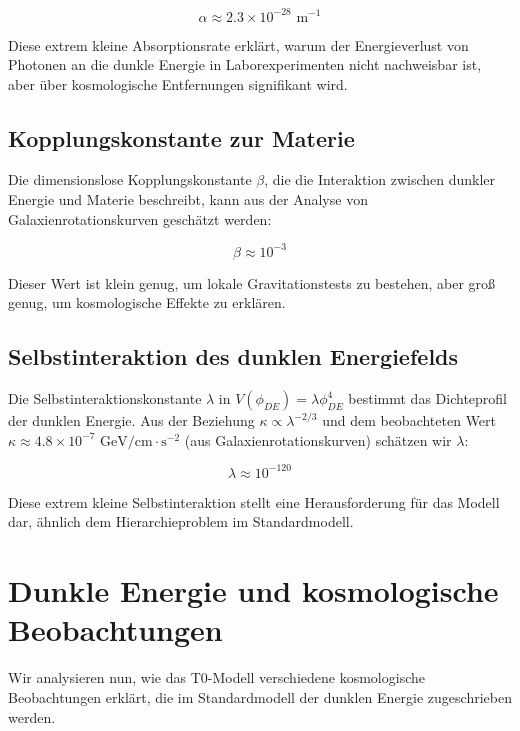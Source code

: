 \documentclass[a4paper,12pt]{article}
\theoremstyle{definition}
\theoremstyle{remark}
\begin{document}
	\begin{equation}
		\alpha \approx 2.3 \times 10^{-28} \text{ m}^{-1}
	\end{equation}
	
	Diese extrem kleine Absorptionsrate erklärt, warum der Energieverlust von Photonen an die dunkle Energie in Laborexperimenten nicht nachweisbar ist, aber über kosmologische Entfernungen signifikant wird.
	
	\subsection{Kopplungskonstante zur Materie}
	Die dimensionslose Kopplungskonstante $\beta$, die die Interaktion zwischen dunkler Energie und Materie beschreibt, kann aus der Analyse von Galaxienrotationskurven geschätzt werden:
	
	\begin{equation}
		\beta \approx 10^{-3}
	\end{equation}
	
	Dieser Wert ist klein genug, um lokale Gravitationstests zu bestehen, aber groß genug, um kosmologische Effekte zu erklären.
	
	\subsection{Selbstinteraktion des dunklen Energiefelds}
	Die Selbstinteraktionskonstante $\lambda$ in $V(\phi_{DE}) = \lambda \phi_{DE}^4$ bestimmt das Dichteprofil der dunklen Energie. Aus der Beziehung $\kappa \propto \lambda^{-2/3}$ und dem beobachteten Wert $\kappa \approx 4.8 \times 10^{-7} \text{ GeV/cm} \cdot \text{s}^{-2}$ (aus Galaxienrotationskurven) schätzen wir $\lambda$:
	
	\begin{equation}
		\lambda \approx 10^{-120}
	\end{equation}
	
	Diese extrem kleine Selbstinteraktion stellt eine Herausforderung für das Modell dar, ähnlich dem Hierarchieproblem im Standardmodell.
	
	\section{Dunkle Energie und kosmologische Beobachtungen}
	Wir analysieren nun, wie das T0-Modell verschiedene kosmologische Beobachtungen erklärt, die im Standardmodell der dunklen Energie zugeschrieben werden.
	
\end{document}

